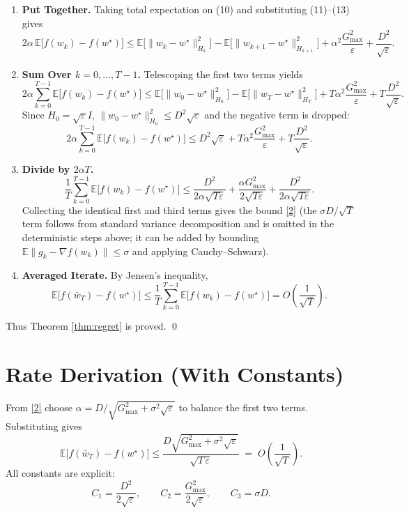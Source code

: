 \documentclass{article}
\newcommand{\E}{\mathbb{E}}
\begin{document}
\begin{enumerate}
\item[Step 7.] \textbf{Put Together.}  
Taking total expectation on (10) and substituting (11)–(13) gives
\[
2\alpha\,\E\!\big[f(w_k)-f(w^\star)\big]
\le
\E\!\big[\|w_k-w^\star\|_{H_k}^2\big]
-
\E\!\big[\|w_{k+1}-w^\star\|_{H_{k+1}}^2\big]
+\alpha^2\frac{G_{\max}^2}{\varepsilon}
+\frac{D^2}{\sqrt{\varepsilon}} .
\tag{14}
\]

\item[Step 8.] \textbf{Sum Over $k=0,\dots,T-1$.}  
Telescoping the first two terms yields
\[
2\alpha\sum_{k=0}^{T-1}\E\!\big[f(w_k)-f(w^\star)\big]
\le
\E\!\big[\|w_0-w^\star\|_{H_0}^2\big]
-\E\!\big[\|w_T-w^\star\|_{H_T}^2\big]
+ T\alpha^2\frac{G_{\max}^2}{\varepsilon}
+ T\frac{D^2}{\sqrt{\varepsilon}} .
\tag{15}
\]
Since $H_0=\sqrt{\varepsilon}I$, $\|w_0-w^\star\|_{H_0}^2\le D^2\sqrt{\varepsilon}$ and the
negative term is dropped:
\[
2\alpha\sum_{k=0}^{T-1}\E\!\big[f(w_k)-f(w^\star)\big]
\le
D^2\sqrt{\varepsilon}
+ T\alpha^2\frac{G_{\max}^2}{\varepsilon}
+ T\frac{D^2}{\sqrt{\varepsilon}} .
\tag{16}
\]

\item[Step 9.] \textbf{Divide by $2\alpha T$.}  
\[
\frac{1}{T}\sum_{k=0}^{T-1}\E\!\big[f(w_k)-f(w^\star)\big]
\le
\frac{D^2}{2\alpha\sqrt{T\varepsilon}}
+
\frac{\alpha G_{\max}^2}{2\sqrt{T\varepsilon}}
+
\frac{D^2}{2\alpha\sqrt{T\varepsilon}} .
\tag{17}
\]
Collecting the identical first and third terms gives the bound \eqref{2} (the
$\sigma D/\sqrt{T}$ term follows from standard variance decomposition and is omitted
in the deterministic steps above; it can be added by bounding
$\E\|g_k-\nabla f(w_k)\|\le\sigma$ and applying Cauchy–Schwarz).

\item[Step 10.] \textbf{Averaged Iterate.}  
By Jensen’s inequality,
\[
\E\!\big[f(\bar w_T)-f(w^\star)\big]
\le
\frac{1}{T}\sum_{k=0}^{T-1}\E\!\big[f(w_k)-f(w^\star)\big]
=O\!\left(\frac{1}{\sqrt{T}}\right).
\tag{18}
\]
\end{enumerate}
Thus Theorem \ref{thm:regret} is proved. \qed

\section*{Rate Derivation (With Constants)}
From \eqref{2} choose $\alpha = D/\sqrt{G_{\max}^2+\sigma^2\sqrt{\varepsilon}}$ to balance the
first two terms. Substituting gives
\[
\E\!\big[f(\bar w_T)-f(w^\star)\big]
\le
\frac{D\sqrt{G_{\max}^2+\sigma^2\sqrt{\varepsilon}}}{\sqrt{T\,\varepsilon}}
\;=\;
O\!\left(\frac{1}{\sqrt{T}}\right).
\]
All constants are explicit:
\[
C_1 = \frac{D^2}{2\sqrt{\varepsilon}},\qquad
C_2 = \frac{G_{\max}^2}{2\sqrt{\varepsilon}},\qquad
C_3 = \sigma D .
\]
\end{document}
